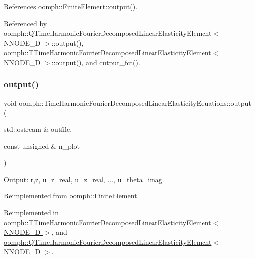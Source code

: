 References oomph\+::\+Finite\+Element\+::output().



Referenced by oomph\+::\+Q\+Time\+Harmonic\+Fourier\+Decomposed\+Linear\+Elasticity\+Element$<$ N\+N\+O\+D\+E\+\_\+D $>$\+::output(), oomph\+::\+T\+Time\+Harmonic\+Fourier\+Decomposed\+Linear\+Elasticity\+Element$<$ N\+N\+O\+D\+E\+\_\+D $>$\+::output(), and output\+\_\+fct().

\mbox{\label{classoomph_1_1TimeHarmonicFourierDecomposedLinearElasticityEquations_ae93876a9ca68be25baa7cd1d4178990e}} 
\subsubsection{\texorpdfstring{output()}{output()}\hspace{0.1cm}{\footnotesize\ttfamily [2/4]}}
{\footnotesize\ttfamily void oomph\+::\+Time\+Harmonic\+Fourier\+Decomposed\+Linear\+Elasticity\+Equations\+::output (\begin{DoxyParamCaption}\item[{std\+::ostream \&}]{outfile,  }\item[{const unsigned \&}]{n\+\_\+plot }\end{DoxyParamCaption})\hspace{0.3cm}{\ttfamily [virtual]}}



Output\+: r,z, u\+\_\+r\+\_\+real, u\+\_\+z\+\_\+real, ..., u\+\_\+theta\+\_\+imag. 



Reimplemented from \hyperlink{classoomph_1_1FiniteElement_afa9d9b2670f999b43e6679c9dd28c457}{oomph\+::\+Finite\+Element}.



Reimplemented in \hyperlink{classoomph_1_1TTimeHarmonicFourierDecomposedLinearElasticityElement_a8f1141e19dcdd594824d1adc971b2832}{oomph\+::\+T\+Time\+Harmonic\+Fourier\+Decomposed\+Linear\+Elasticity\+Element$<$ N\+N\+O\+D\+E\+\_\+D $>$}, and \hyperlink{classoomph_1_1QTimeHarmonicFourierDecomposedLinearElasticityElement_a42122255353025f62a4ff73fc35db587}{oomph\+::\+Q\+Time\+Harmonic\+Fourier\+Decomposed\+Linear\+Elasticity\+Element$<$ N\+N\+O\+D\+E\+\_\+D $>$}.



